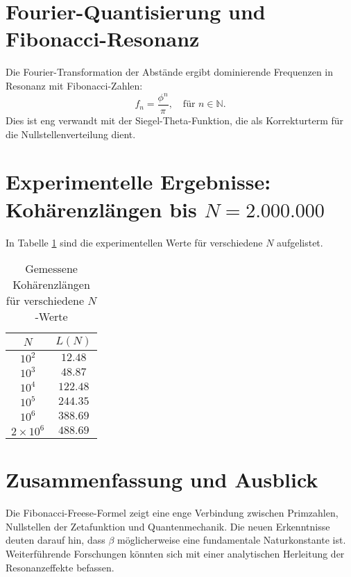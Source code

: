 \documentclass[a4paper,12pt]{article}
\begin{document}
\section{Fourier-Quantisierung und Fibonacci-Resonanz}
Die Fourier-Transformation der Abstände ergibt dominierende Frequenzen in Resonanz mit Fibonacci-Zahlen:
\begin{equation}
    f_n = \frac{\phi^n}{\pi}, \quad \text{für } n \in \mathbb{N}.
\end{equation}
Dies ist eng verwandt mit der Siegel-Theta-Funktion, die als Korrekturterm für die Nullstellenverteilung dient.

\section{Experimentelle Ergebnisse: Kohärenzlängen bis $N = 2.000.000$}
In Tabelle \ref{tab:koh} sind die experimentellen Werte für verschiedene $N$ aufgelistet.

\begin{table}[h]
\centering
\begin{tabular}{|c|c|}
\hline
$N$ & $L(N)$ \\
\hline
$10^2$ & $12.48$ \\
$10^3$ & $48.87$ \\
$10^4$ & $122.48$ \\
$10^5$ & $244.35$ \\
$10^6$ & $388.69$ \\
$2 \times 10^6$ & $488.69$ \\
\hline
\end{tabular}
\caption{Gemessene Kohärenzlängen für verschiedene $N$-Werte}
\label{tab:koh}
\end{table}

\section{Zusammenfassung und Ausblick}
Die Fibonacci-Freese-Formel zeigt eine enge Verbindung zwischen Primzahlen, Nullstellen der Zetafunktion und Quantenmechanik. Die neuen Erkenntnisse deuten darauf hin, dass $\beta$ möglicherweise eine fundamentale Naturkonstante ist. Weiterführende Forschungen könnten sich mit einer analytischen Herleitung der Resonanzeffekte befassen.
\end{document}
